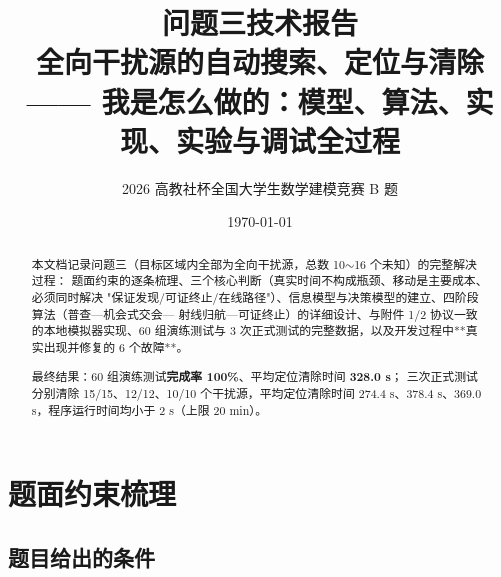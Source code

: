 

\title{\heiti 问题三技术报告\\[4pt]
       \large 全向干扰源的自动搜索、定位与清除\\[2pt]
       \normalsize —— 我是怎么做的：模型、算法、实现、实验与调试全过程}
\author{2026 高教社杯全国大学生数学建模竞赛 B 题}
\date{\today}


\maketitle
\thispagestyle{fancy}

\begin{abstract}
\noindent
本文档记录问题三（目标区域内全部为全向干扰源，总数 10$\sim$16 个未知）的完整解决过程：
题面约束的逐条梳理、三个核心判断（真实时间不构成瓶颈、移动是主要成本、必须同时解决
"保证发现/可证终止/在线路径"）、信息模型与决策模型的建立、四阶段算法（普查—机会式交会—
射线归航—可证终止）的详细设计、与附件 1/2 协议一致的本地模拟器实现、60 组演练测试与
3 次正式测试的完整数据，以及开发过程中**真实出现并修复的 6 个故障**。

最终结果：60 组演练测试\textbf{完成率 100\%}、平均定位清除时间 \textbf{328.0 s}；
三次正式测试分别清除 15/15、12/12、10/10 个干扰源，平均定位清除时间
274.4 s、378.4 s、369.0 s，程序运行时间均小于 2 s（上限 20 min）。
\end{abstract}

\tableofcontents
\newpage

\section{题面约束梳理}

\subsection{题目给出的条件}

